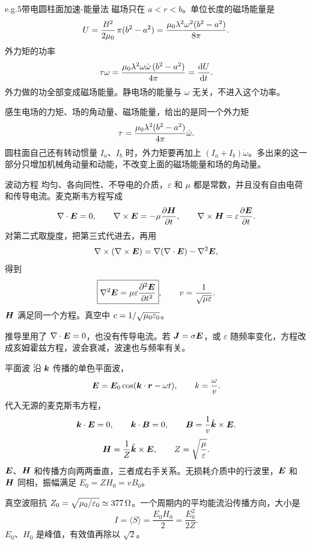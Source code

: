 \begin{frame}{e.g.5带电圆柱面加速-能量法}
磁场只在 $a<r<b$。单位长度的磁场能量是
\[
 U=\frac{B^2}{2\mu_0}\,\pi(b^2-a^2)
 =\frac{\mu_0\lambda^2\omega^2(b^2-a^2)}{8\pi}.
\]
外力矩的功率
\[
 \tau\omega=\frac{\mu_0\lambda^2\omega\dot\omega\,(b^2-a^2)}{4\pi}
 =\frac{\mathop{}\!\mathrm d U}{\mathop{}\!\mathrm d t}.
\]
外力做的功全部变成磁场能量。静电场的能量与 $\omega$ 无关，不进入这个功率。

感生电场的力矩、场的角动量、磁场能量，给出的是同一个外力矩
\[
 \tau=\frac{\mu_0\lambda^2(b^2-a^2)}{4\pi}\dot\omega.
\]
圆柱面自己还有转动惯量 $I_a$、$I_b$ 时，外力矩要再加上 $(I_a+I_b)\dot\omega$。多出来的这一部分只增加机械角动量和动能，不改变上面的磁场能量和场的角动量。
\end{frame}

\begin{frame}{波动方程}
均匀、各向同性、不导电的介质，$\varepsilon$ 和 $\mu$ 都是常数，并且没有自由电荷和传导电流。麦克斯韦方程写成
\[
 \nabla\cdot\bm{E}=0,\qquad
 \nabla\times\bm{E}=-\mu\frac{\partial\bm{H}}{\partial t},\qquad
 \nabla\times\bm{H}=\varepsilon\frac{\partial\bm{E}}{\partial t}.
\]
对第二式取旋度，把第三式代进去，再用
\[
 \nabla\times(\nabla\times\bm{E})
 =\nabla(\nabla\cdot\bm{E})-\nabla^2\bm{E},
\]
得到
\[
 \boxed{\nabla^2\bm{E}
 =\mu\varepsilon\frac{\partial^2\bm{E}}{\partial t^2}},
 \qquad
 v=\frac{1}{\sqrt{\mu\varepsilon}}.
\]
$\bm{H}$ 满足同一个方程。真空中 $c=1/\sqrt{\mu_0\varepsilon_0}$。

推导里用了 $\nabla\cdot\bm{E}=0$，也没有传导电流。若 $\bm{J}=\sigma\bm{E}$，或 $\varepsilon$ 随频率变化，方程改成亥姆霍兹方程，波会衰减，波速也与频率有关。
\end{frame}

\begin{frame}{平面波}
沿 $\bm{k}$ 传播的单色平面波，
\[
 \bm{E}=\bm{E}_0\cos(\bm{k}\cdot\bm{r}-\omega t),
 \qquad k=\frac{\omega}{v}.
\]
代入无源的麦克斯韦方程，
\[
 \bm{k}\cdot\bm{E}=0,\qquad
 \bm{k}\cdot\bm{B}=0,\qquad
 \bm{B}=\frac1v\hat{\bm{k}}\times\bm{E}.
\]
\[
 \bm{H}=\frac1Z\hat{\bm{k}}\times\bm{E},
 \qquad
 Z=\sqrt{\frac{\mu}{\varepsilon}}.
\]
$\bm{E}$、$\bm{H}$ 和传播方向两两垂直，三者成右手关系。无损耗介质中的行波里，$\bm{E}$ 和 $\bm{H}$ 同相，振幅满足 $E_0=ZH_0=vB_0$。

真空波阻抗 $Z_0=\sqrt{\mu_0/\varepsilon_0}\simeq377\,\Omega$。一个周期内的平均能流沿传播方向，大小是
\[
 I=\langle S\rangle=\frac{E_0H_0}{2}=\frac{E_0^2}{2Z}.
\]
$E_0$、$H_0$ 是峰值，有效值再除以 $\sqrt2$。
\end{frame}

